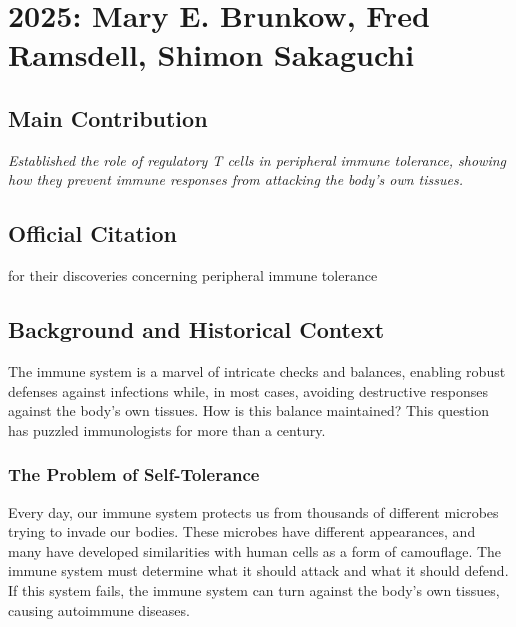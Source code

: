 \chapter[2025 --- Brunkow et al.]{2025: Mary E. Brunkow, Fred Ramsdell, Shimon Sakaguchi}
\label{ch:2025_Brunkow}

\section*{Main Contribution}

\textit{Established the role of regulatory T cells in peripheral immune tolerance, showing how they prevent immune responses from attacking the body's own tissues.}\cite{nobel-2025,lecture-2025}

\section{Official Citation}

for their discoveries concerning peripheral immune tolerance

\section{Background and Historical Context}

The immune system is a marvel of intricate checks and balances, enabling robust defenses against infections while, in most cases, avoiding destructive responses against the body's own tissues. How is this balance maintained? This question has puzzled immunologists for more than a century.

\subsection{The Problem of Self-Tolerance}

Every day, our immune system protects us from thousands of different microbes trying to invade our bodies. These microbes have different appearances, and many have developed similarities with human cells as a form of camouflage. The immune system must determine what it should attack and what it should defend. If this system fails, the immune system can turn against the body's own tissues, causing autoimmune diseases.

